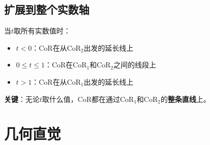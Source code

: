 \documentclass[12pt,a4paper]{article}
\begin{document}
\subsection{扩展到整个实数轴}

当$t$取所有实数值时：
\begin{itemize}
\item $t < 0$：CoR在从CoR$_2$出发的延长线上
\item $0 \leq t \leq 1$：CoR在CoR$_1$和CoR$_2$之间的线段上
\item $t > 1$：CoR在从CoR$_1$出发的延长线上
\end{itemize}

\textbf{关键}：无论$t$取什么值，CoR都在通过CoR$_1$和CoR$_2$的\textbf{整条直线}上。

\section{几何直觉}
\end{document}
